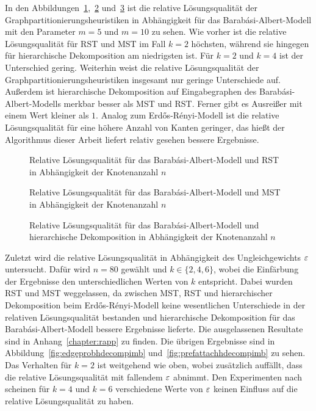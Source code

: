 \vfill\clearpage

In den Abbildungen~\ref{fig:prefattachrstnode},~\ref{fig:prefattachmstnode} und~\ref{fig:prefattachhdecompnode} ist die relative Lösungsqualität der Graphpartitionierungsheuristiken in Abhängigkeit für das Barabási-Albert-Modell mit den Parameter $m=5$ und $m=10$ zu sehen.
Wie vorher ist die relative Lösungsqualität für RST und MST im Fall $k=2$ höchsten, während sie hingegen für hierarchische Dekomposition am niedrigsten ist.
Für $k=2$ und $k=4$ ist der Unterschied gering.
Weiterhin weist die relative Lösungsqualität der Graphpartitionierungsheuristiken insgesamt nur geringe Unterschiede auf.
Außerdem ist hierarchische Dekomposition auf Eingabegraphen des Barabási-Albert-Modells merkbar besser als MST und RST.
Ferner gibt es Ausreißer mit einem Wert kleiner als $1$.
Analog zum Erdős-Rényi-Modell ist die relative Lösungsqualität für eine höhere Anzahl von Kanten geringer, das hießt der Algorithmus dieser Arbeit liefert relativ gesehen bessere Ergebnisse.

\begin{figure}[H]
    \centering
    
    \caption{Relative Lösungsqualität für das Barabási-Albert-Modell und RST in Abhängigkeit der Knotenanzahl $n$\label{fig:prefattachrstnode}}
\end{figure}

\begin{figure}[H]
    \centering
    
    \caption{Relative Lösungsqualität für das Barabási-Albert-Modell und MST in Abhängigkeit der Knotenanzahl $n$\label{fig:prefattachmstnode}}
\end{figure}

\begin{figure}[H]
    \centering
    
    \caption{Relative Lösungsqualität für das Barabási-Albert-Modell und hierarchische Dekomposition in Abhängigkeit der Knotenanzahl $n$\label{fig:prefattachhdecompnode}}
\end{figure}

\vfill\clearpage

Zuletzt wird die relative Lösungsqualität in Abhängigkeit des Ungleichgewichts $\varepsilon$ untersucht.
Dafür wird $n=80$ gewählt und $k \in \{2, 4, 6\}$, wobei die Einfärbung der Ergebnisse den unterschiedlichen Werten von $k$ entspricht.
Dabei wurden RST und MST weggelassen, da zwischen MST, RST und hierarchischer Dekomposition beim Erdős-Rényi-Modell keine wesentlichen Unterschiede in der relativen Lösungsqualität bestanden und hierarchische Dekomposition für das Barabási-Albert-Modell bessere Ergebnisse lieferte.
Die ausgelassenen Resultate sind in Anhang~\ref{chapter:rapp} zu finden.
Die übrigen Ergebnisse sind in Abbildung~\ref{fig:edgeprobhdecompimb} und~\ref{fig:prefattachhdecompimb} zu sehen.
Das Verhalten für $k=2$ ist weitgehend wie oben, wobei zusätzlich auffällt, dass die relative Lösungsqualität mit fallendem $\varepsilon$ abnimmt.
Den Experimenten nach scheinen für $k=4$ und $k=6$ verschiedene Werte von $\varepsilon$ keinen Einfluss auf die relative Lösungsqualität zu haben.

